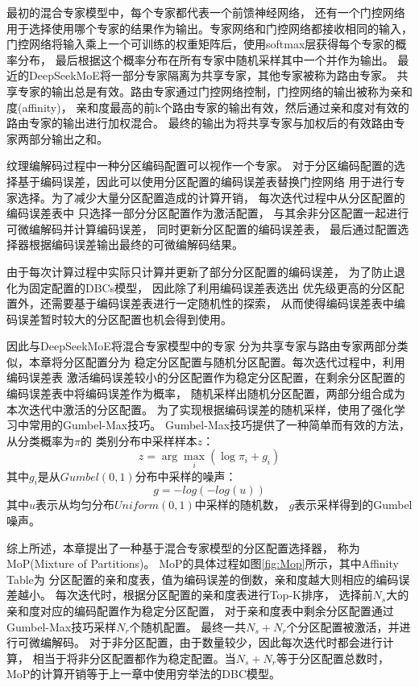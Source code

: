 最初的混合专家模型\cite{jacobs1991adaptive}中，每个专家都代表一个前馈神经网络，
还有一个门控网络用于选择使用哪个专家的结果作为输出。专家网络和门控网络都接收相同的输入，
门控网络将输入乘上一个可训练的权重矩阵后，使用softmax层获得每个专家的概率分布，
最后根据这个概率分布在所有专家中随机采样其中一个并作为输出。
最近的DeepSeekMoE\cite{dai2024deepseekmoe}将一部分专家隔离为共享专家，其他专家被称为路由专家。
共享专家的输出总是有效。路由专家通过门控网络控制，门控网络的输出被称为亲和度(affinity)，
亲和度最高的前k个路由专家的输出有效，然后通过亲和度对有效的路由专家的输出进行加权混合。
最终的输出为将共享专家与加权后的有效路由专家两部分输出之和。

纹理编解码过程中一种分区编码配置可以视作一个专家。
对于分区编码配置的选择基于编码误差，因此可以使用分区配置的编码误差表替换门控网络
用于进行专家选择。为了减少大量分区配置造成的计算开销，
每次迭代过程中从分区配置的编码误差表中
只选择一部分分区配置作为激活配置，
与其余非分区配置一起进行可微编解码并计算编码误差，
同时更新分区配置的编码误差表，
最后通过配置选择器根据编码误差输出最终的可微编解码结果。

由于每次计算过程中实际只计算并更新了部分分区配置的编码误差，
为了防止退化为固定配置的DBCs模型，
因此除了利用编码误差表选出
优先级更高的分区配置外，还需要基于编码误差表进行一定随机性的探索，
从而使得编码误差表中编码误差暂时较大的分区配置也机会得到使用。

因此与DeepSeekMoE\cite{dai2024deepseekmoe}将混合专家模型中的专家
分为共享专家与路由专家两部分类似，本章将分区配置分为
稳定分区配置与随机分区配置。每次迭代过程中，利用编码误差表
激活编码误差较小的分区配置作为稳定分区配置，在剩余分区配置的编码误差表中将编码误差作为概率，
随机采样出随机分区配置，两部分组合成为本次迭代中激活的分区配置。
为了实现根据编码误差的随机采样，使用了强化学习中常用的Gumbel-Max技巧\cite{jang2016categorical}。
Gumbel-Max技巧提供了一种简单而有效的方法，从分类概率为$\pi$的
类别分布中采样样本$z$：
\begin{equation}
z = \arg\max_i \left( \log\pi_i + g_i \right)
\end{equation}
其中$g_i$是从$Gumbel(0, 1)$分布中采样的噪声：
\begin{equation}
    g = -log(-log(u))
\end{equation}
其中$u$表示从均匀分布$Uniform(0, 1)$中采样的随机数，
$g$表示采样得到的Gumbel噪声。

综上所述，本章提出了一种基于混合专家模型的分区配置选择器，
称为MoP(Mixture of Partitions)。
MoP的具体过程如图\ref{fig:Mop}所示，其中Affinity Table为
分区配置的亲和度表，值为编码误差的倒数，亲和度越大则相应的编码误差越小。
每次迭代时，根据分区配置的亲和度表进行Top-K排序，
选择前$N_s$大的亲和度对应的编码配置作为稳定分区配置，
对于亲和度表中剩余分区配置通过Gumbel-Max技巧采样$N_r$个随机配置。
最终一共$N_s+N_r$个分区配置被激活，并进行可微编解码。
对于非分区配置，由于数量较少，因此每次迭代时都会进行计算，
相当于将非分区配置都作为稳定配置。当$N_s+N_r$等于分区配置总数时，
MoP的计算开销等于上一章中使用穷举法的DBC模型。

